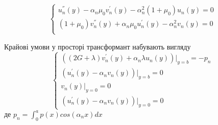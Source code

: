 \begin{equation}\label{transf_static_1}
    \begin{cases}
        u_n^{''}(y) - \alpha_n \mu_0 v_n^{'}(y) - \alpha_n^2 (1 + \mu_0) u_n(y) = 0 \\
        (1 + \mu_0) v_n^{''}(y) + \alpha_n \mu_0 u_n^{'}(y)  - \alpha_n^2 v_n(y) = 0 \\
    \end{cases}
\end{equation}

Крайові умови у просторі трансформант набувають вигляду
\begin{equation}\label{transf_bound_static_1}
    \begin{cases}
        \left( (2G + \lambda)v_n^{'}(y) + \alpha_n \lambda u_n(y) \right)|_{y=b} = -p_n \\
        \left(u_n^{'}(y) - \alpha_n v_n(y)  \right)|_{y=b} = 0 \\
        v_n(y)|_{y=0} = 0 \\
        \left(u_n^{'}(y) - \alpha_n v_n(y)  \right)|_{y=0} = 0
    \end{cases}
\end{equation}
де $p_n = \int_{0}^{a} p(x) cos(\alpha_n x) dx$

